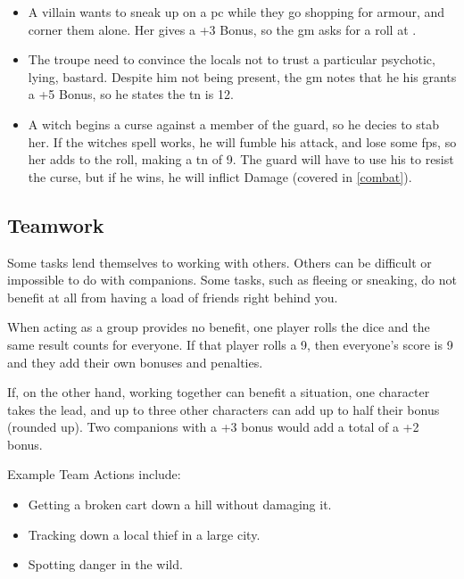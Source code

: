 \begin{multicols}{2}
\begin{itemize}
  \item
    A villain wants to sneak up on a \gls{pc} while they go shopping for armour, and corner them alone.
    Her  gives a +3 Bonus, so the \gls{gm} asks for a  roll at \tn[10].
  \item
    The troupe need to convince the locals not to trust a particular psychotic, lying, bastard.
    Despite him not being present, the \gls{gm} notes that he his  grants a +5 Bonus, so he states the \gls{tn} is 12.
  \item
    A witch begins a curse against a member of the \gls{guard}, so he decies to stab her.
    If the witches spell works, he will fumble his attack, and lose some \glspl{fp}, so her  adds to the roll, making a \gls{tn} of 9.
    The guard will have to use his  to resist the curse, but if he wins, he will inflict Damage (covered in \autoref{combat}).
\end{itemize}

\subsection{Teamwork}
\label{teamwork}

Some tasks lend themselves to working with others. Others can be difficult or impossible to do with companions. Some tasks, such as fleeing or sneaking, do not benefit at all from having a load of friends right behind you.

When acting as a group provides no benefit, one player rolls the dice and the same result counts for everyone.  If that player rolls a 9, then everyone's score is 9 and they add their own bonuses and penalties.

If, on the other hand, working together can benefit a situation, one character takes the lead, and up to three other characters can add up to half their bonus (rounded up).
Two companions with a +3 bonus would add a total of a +2 bonus.


\begin{exampletext}
  Example Team Actions include:

  \begin{itemize}

  \item Getting a broken cart down a hill without damaging it.
  \item Tracking down a local thief in a large city.
  \item Spotting danger in the wild.


\end{itemize}
\end{exampletext}
\end{multicols}
